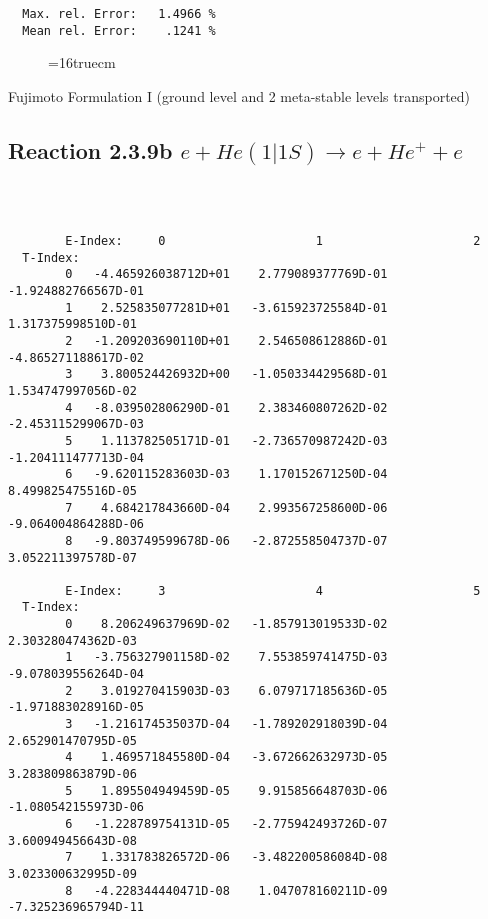 \documentclass[12pt]{article}
\begin{document}
\begin{small}
\begin{verbatim}
  Max. rel. Error:   1.4966 %
  Mean rel. Error:    .1241 %

\end{verbatim}\end{small}
\begin{figure} \label{2.3.9a}
\epsfxsize=16truecm
\end{figure}
\newpage


 Fujimoto Formulation I (ground level and 2 meta-stable levels transported)

\subsection{
Reaction 2.3.9b  $e + He(1|1S) \rightarrow e + He^+ + e  $
}


\begin{small}\begin{verbatim}



        E-Index:     0                     1                     2
  T-Index:
        0   -4.465926038712D+01    2.779089377769D-01   -1.924882766567D-01
        1    2.525835077281D+01   -3.615923725584D-01    1.317375998510D-01
        2   -1.209203690110D+01    2.546508612886D-01   -4.865271188617D-02
        3    3.800524426932D+00   -1.050334429568D-01    1.534747997056D-02
        4   -8.039502806290D-01    2.383460807262D-02   -2.453115299067D-03
        5    1.113782505171D-01   -2.736570987242D-03   -1.204111477713D-04
        6   -9.620115283603D-03    1.170152671250D-04    8.499825475516D-05
        7    4.684217843660D-04    2.993567258600D-06   -9.064004864288D-06
        8   -9.803749599678D-06   -2.872558504737D-07    3.052211397578D-07

        E-Index:     3                     4                     5
  T-Index:
        0    8.206249637969D-02   -1.857913019533D-02    2.303280474362D-03
        1   -3.756327901158D-02    7.553859741475D-03   -9.078039556264D-04
        2    3.019270415903D-03    6.079717185636D-05   -1.971883028916D-05
        3   -1.216174535037D-04   -1.789202918039D-04    2.652901470795D-05
        4    1.469571845580D-04   -3.672662632973D-05    3.283809863879D-06
        5    1.895504949459D-05    9.915856648703D-06   -1.080542155973D-06
        6   -1.228789754131D-05   -2.775942493726D-07    3.600949456643D-08
        7    1.331783826572D-06   -3.482200586084D-08    3.023300632995D-09
        8   -4.228344440471D-08    1.047078160211D-09   -7.325236965794D-11


\end{verbatim}
\end{small}
\end{document}
